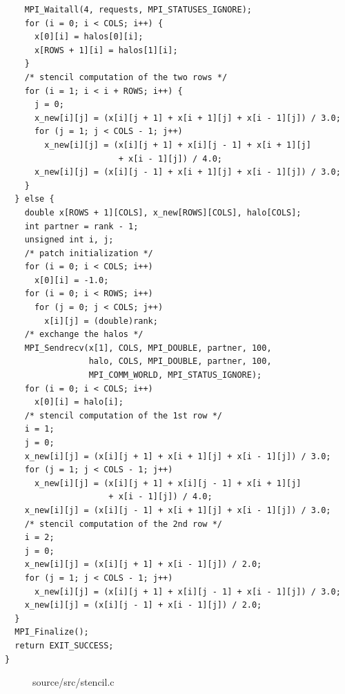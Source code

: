 \documentclass[12pt]{article}
\begin{document}
\begin{verbatim}
    MPI_Waitall(4, requests, MPI_STATUSES_IGNORE);
    for (i = 0; i < COLS; i++) {
      x[0][i] = halos[0][i];
      x[ROWS + 1][i] = halos[1][i];
    }
    /* stencil computation of the two rows */
    for (i = 1; i < i + ROWS; i++) {
      j = 0;
      x_new[i][j] = (x[i][j + 1] + x[i + 1][j] + x[i - 1][j]) / 3.0;
      for (j = 1; j < COLS - 1; j++)
        x_new[i][j] = (x[i][j + 1] + x[i][j - 1] + x[i + 1][j]
                       + x[i - 1][j]) / 4.0;
      x_new[i][j] = (x[i][j - 1] + x[i + 1][j] + x[i - 1][j]) / 3.0;
    }
  } else {
    double x[ROWS + 1][COLS], x_new[ROWS][COLS], halo[COLS];
    int partner = rank - 1;
    unsigned int i, j;
    /* patch initialization */
    for (i = 0; i < COLS; i++)
      x[0][i] = -1.0;
    for (i = 0; i < ROWS; i++)
      for (j = 0; j < COLS; j++)
        x[i][j] = (double)rank;
    /* exchange the halos */
    MPI_Sendrecv(x[1], COLS, MPI_DOUBLE, partner, 100,
                 halo, COLS, MPI_DOUBLE, partner, 100,
                 MPI_COMM_WORLD, MPI_STATUS_IGNORE);
    for (i = 0; i < COLS; i++)
      x[0][i] = halo[i];
    /* stencil computation of the 1st row */
    i = 1;
    j = 0;
    x_new[i][j] = (x[i][j + 1] + x[i + 1][j] + x[i - 1][j]) / 3.0;
    for (j = 1; j < COLS - 1; j++)
      x_new[i][j] = (x[i][j + 1] + x[i][j - 1] + x[i + 1][j]
                     + x[i - 1][j]) / 4.0;
    x_new[i][j] = (x[i][j - 1] + x[i + 1][j] + x[i - 1][j]) / 3.0;
    /* stencil computation of the 2nd row */
    i = 2;
    j = 0;
    x_new[i][j] = (x[i][j + 1] + x[i - 1][j]) / 2.0;
    for (j = 1; j < COLS - 1; j++)
      x_new[i][j] = (x[i][j + 1] + x[i][j - 1] + x[i - 1][j]) / 3.0;
    x_new[i][j] = (x[i][j - 1] + x[i - 1][j]) / 2.0;
  }
  MPI_Finalize();
  return EXIT_SUCCESS;
}
\end{verbatim}

\begin{figure}[h!]
	\caption{source/src/stencil.c}\label{code:stencilc}
\end{figure}
\end{document}
